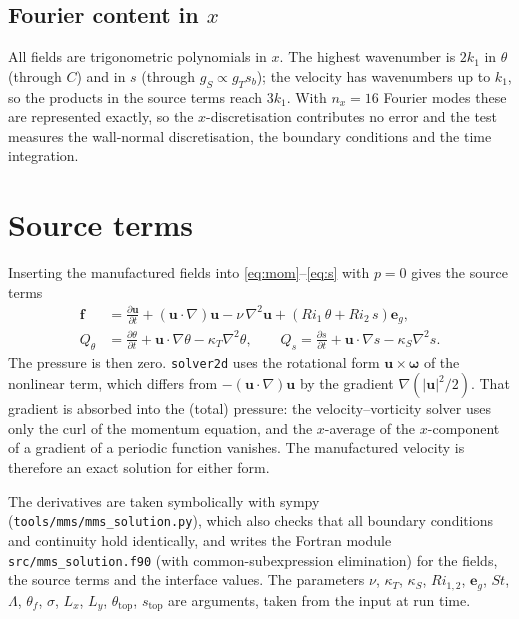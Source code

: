 \documentclass[11pt,a4paper]{article}
\newcommand{\pd}[2]{\frac{\partial #1}{\partial #2}}
\begin{document}
\subsection{\texorpdfstring{Fourier content in $x$}{Fourier content in x}}

All fields are trigonometric polynomials in $x$. The highest wavenumber is $2k_1$ in $\theta$ (through $C$)
and in $s$ (through $g_S\propto g_T s_b$); the velocity has wavenumbers up to $k_1$, so the products in the
source terms reach $3k_1$. With
$n_x=16$ Fourier modes these are represented exactly, so the $x$-discretisation contributes no error and
the test measures the wall-normal discretisation, the boundary conditions and the time integration.

\section{Source terms}

Inserting the manufactured fields into \eqref{eq:mom}--\eqref{eq:s} with $p=0$ gives the source terms
\begin{align}
  \mathbf f &= \pd{\mathbf u}{t} + (\mathbf u\cdot\nabla)\mathbf u - \nu\,\nabla^2\mathbf u
               + \left(Ri_1\,\theta + Ri_2\,s\right)\mathbf e_g, \\
  Q_\theta &= \pd{\theta}{t} + \mathbf u\cdot\nabla\theta - \kappa_T\nabla^2\theta, \qquad
  Q_s = \pd{s}{t} + \mathbf u\cdot\nabla s - \kappa_S\nabla^2 s .
\end{align}
The pressure is then zero. \texttt{solver2d} uses the rotational form $\mathbf u\times\boldsymbol\omega$ of
the nonlinear term, which differs from $-(\mathbf u\cdot\nabla)\mathbf u$ by the gradient
$\nabla(|\mathbf u|^2/2)$. That gradient is absorbed into the (total) pressure: the velocity--vorticity
solver uses only the curl of the momentum equation, and the $x$-average of the $x$-component of a gradient
of a periodic function vanishes. The manufactured velocity is therefore an exact solution for either form.

The derivatives are taken symbolically with sympy (\texttt{tools/mms/mms\_solution.py}), which also checks
that all boundary conditions and continuity hold identically, and writes the Fortran module
\texttt{src/mms\_solution.f90} (with common-subexpression elimination) for the fields, the source terms and
the interface values. The parameters $\nu$, $\kappa_T$, $\kappa_S$, $Ri_{1,2}$, $\mathbf e_g$, $St$, $\Lambda$,
$\theta_f$, $\sigma$, $L_x$, $L_y$, $\theta_{\mathrm{top}}$, $s_{\mathrm{top}}$ are arguments, taken from the input
at run time.
\end{document}
